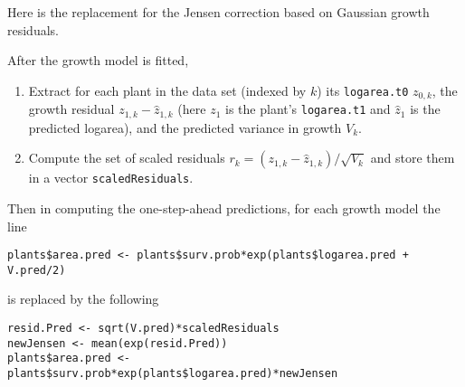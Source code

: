\documentclass[11pt]{article}
\numberwithin{equation}{section}
\begin{document}
Here is the replacement for the Jensen correction based on Gaussian growth residuals. 

After the growth model is fitted,

\begin{enumerate}
\item  Extract for each plant in the data set (indexed by $k$) 
its \texttt{logarea.t0} $z_{0,k}$, the growth residual $z_{1,k} - \hat{z}_{1,k}$ (here $z_1$ is
the plant's \texttt{logarea.t1} and $\hat{z}_1$ is the predicted logarea), and the predicted variance
in growth $V_k$. 

\item Compute the set of scaled residuals $r_k = (z_{1,k} - \hat{z}_{1,k})/\sqrt{V_k}$ and store them
in a vector \texttt{scaledResiduals}.  
 
\end{enumerate}

Then in computing the one-step-ahead predictions, for each growth model the line 
\begin{verbatim}
plants$area.pred <- plants$surv.prob*exp(plants$logarea.pred + V.pred/2)
\end{verbatim} 
is replaced by the following 
\begin{verbatim}
resid.Pred <- sqrt(V.pred)*scaledResiduals
newJensen <- mean(exp(resid.Pred))
plants$area.pred <- plants$surv.prob*exp(plants$logarea.pred)*newJensen
\end{verbatim} 
\end{document}
